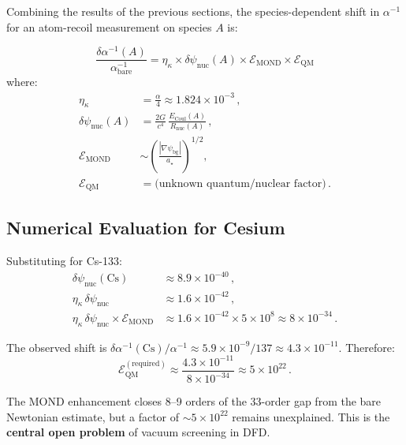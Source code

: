\documentclass[aps,prd,twocolumn,superscriptaddress,nofootinbib]{revtex4-2}
\newcommand{\astar}{a_\star}
\newcommand{\ee}[1]{\times 10^{#1}}
\newcommand{\kap}{\kappa}
\newcommand{\ainv}{\alpha^{-1}}
\newcommand{\dpsi}{\delta\psi}
\begin{document}
Combining the results of the previous sections, the species-dependent
shift in $\ainv$ for an atom-recoil measurement on species $A$ is:

\begin{equation}\label{eq:master-formula}
\boxed{
\frac{\delta\ainv(A)}{\ainv_{\mathrm{bare}}}
= \eta_\kap \times \dpsi_{\mathrm{nuc}}(A) \times
\mathcal{E}_{\mathrm{MOND}} \times \mathcal{E}_{\mathrm{QM}}
}
\end{equation}
where:
\begin{align}
\eta_\kap &= \frac{\alpha}{4} \approx 1.824\ee{-3}\,,\\
\dpsi_{\mathrm{nuc}}(A) &= \frac{2G}{c^4}\,
\frac{E_{\mathrm{Coul}}(A)}{R_{\mathrm{nuc}}(A)}\,,\\
\mathcal{E}_{\mathrm{MOND}} &\sim
\left(\frac{|\nabla\psi_{\mathrm{bg}}|}{\astar}\right)^{1/2},\\
\mathcal{E}_{\mathrm{QM}} &= \text{(unknown quantum/nuclear factor)}\,.
\end{align}

\subsection{Numerical Evaluation for Cesium}

Substituting for Cs-133:
\begin{align}
\dpsi_{\mathrm{nuc}}(\mathrm{Cs})
&\approx 8.9\ee{-40}\,,\\
\eta_\kap\,\dpsi_{\mathrm{nuc}}
&\approx 1.6\ee{-42}\,,\\
\eta_\kap\,\dpsi_{\mathrm{nuc}}\times\mathcal{E}_{\mathrm{MOND}}
&\approx 1.6\ee{-42} \times 5\ee{8} \approx 8\ee{-34}\,.
\end{align}

The observed shift is $\delta\ainv(\mathrm{Cs})/\ainv \approx
5.9\ee{-9}/137 \approx 4.3\ee{-11}$.  Therefore:
\begin{equation}\label{eq:gap}
\mathcal{E}_{\mathrm{QM}}^{(\mathrm{required})} \approx
\frac{4.3\ee{-11}}{8\ee{-34}} \approx 5\ee{22}\,.
\end{equation}

\begin{tcolorbox}[colback=red!5!white, colframe=red!50!black,
title=Magnitude Gap]
The MOND enhancement closes 8--9 orders of the 33-order gap from
the bare Newtonian estimate, but a factor of $\sim\!5\ee{22}$
remains unexplained.  This is the \textbf{central open problem}
of vacuum screening in DFD\@.
\end{tcolorbox}
\end{document}
